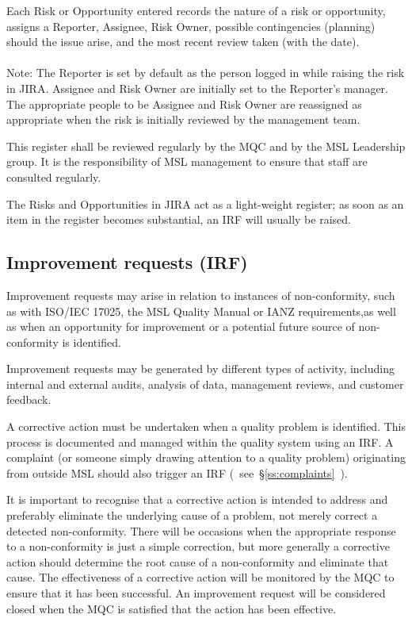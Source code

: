 Each Risk or Opportunity entered records the nature of a risk or opportunity, assigns a Reporter, Assignee, Risk Owner, possible contingencies (planning) should the issue arise, and the most recent review taken (with the date). \\
\\
Note: The Reporter is set by default as the person logged in while raising the risk in JIRA. Assignee and Risk Owner are initially set to the Reporter's manager.  The appropriate people to be Assignee and Risk Owner are reassigned as appropriate when the risk is initially reviewed by the management team.

This register shall be reviewed regularly by the MQC and by the MSL Leadership group. It is the responsibility of MSL management to ensure that staff are consulted regularly. 

The Risks and Opportunities in JIRA act as a light-weight register; as soon as an item in the register becomes substantial, an IRF will usually be raised.

\subsection{Improvement requests (IRF)}
\label{ss:improvement_requests}
Improvement requests may arise in relation to instances of non-conformity, such as with ISO/IEC 17025, the MSL Quality Manual or IANZ requirements,as well as when an opportunity for improvement or a potential future source of non-conformity is identified. 

Improvement requests may be generated by different types of activity, including internal and external audits, analysis of data, management reviews, and customer feedback. 

A corrective action must be undertaken when a quality problem is identified. This process is documented and managed within the quality system using an IRF. A complaint (or someone simply drawing attention to a quality problem) originating from outside MSL should also trigger an IRF (~see~\S\ref{ss:complaints}~).

It is important to recognise that a corrective action is intended to address and preferably eliminate the underlying cause of a problem, not merely correct a detected non-conformity. There will be occasions when the appropriate response to a non-conformity is just a simple correction, but more generally a corrective action should determine the root cause of a non-conformity and eliminate that cause. The effectiveness of a corrective action will be monitored by the MQC to ensure that it has been successful.  An improvement request will be considered closed when the MQC is satisfied that the action has been effective.

